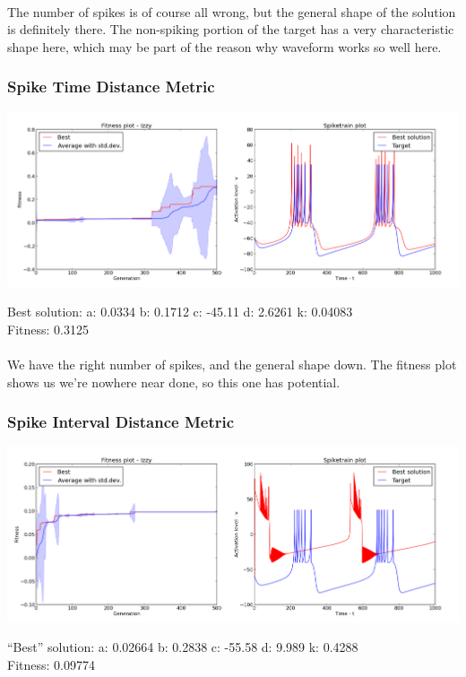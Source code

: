 \documentclass[a4paper,12pt]{article}
\begin{document}
\paragraph{}The number of spikes is of course all wrong, but the general shape of the solution is definitely there. The non-spiking portion of the target has a very characteristic shape here, which may be part of the reason why waveform works so well here.

\subsubsection{Spike Time Distance Metric}
\centerline{\includegraphics[width=1.2\textwidth]{img/case3_time}}
Best solution: 
a: 0.0334 
b: 0.1712 
c: -45.11 
d: 2.6261 
k: 0.04083 \\
Fitness: 0.3125
\paragraph{}We have the right number of spikes, and the general shape down. The fitness plot shows us we're nowhere near done, so this one has potential.

\subsubsection{Spike Interval Distance Metric}
\centerline{\includegraphics[width=1.2\textwidth]{img/case3_int}}
``Best'' solution: 
a: 0.02664 
b: 0.2838 
c: -55.58 
d: 9.989 
k: 0.4288 \\
Fitness: 0.09774
\end{document}
